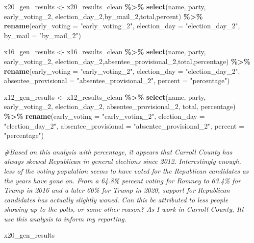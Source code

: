 \documentclass[
]{article}
\newenvironment{Shaded}{\begin{snugshade}}{\end{snugshade}}
\newcommand{\AttributeTok}[1]{\textcolor[rgb]{0.13,0.29,0.53}{#1}}
\newcommand{\CommentTok}[1]{\textcolor[rgb]{0.56,0.35,0.01}{\textit{#1}}}
\newcommand{\FunctionTok}[1]{\textcolor[rgb]{0.13,0.29,0.53}{\textbf{#1}}}
\newcommand{\NormalTok}[1]{#1}
\newcommand{\OtherTok}[1]{\textcolor[rgb]{0.56,0.35,0.01}{#1}}
\newcommand{\SpecialCharTok}[1]{\textcolor[rgb]{0.81,0.36,0.00}{\textbf{#1}}}
\newcommand{\StringTok}[1]{\textcolor[rgb]{0.31,0.60,0.02}{#1}}
\begin{document}
\begin{Shaded}
\begin{Highlighting}[]
\NormalTok{x20\_gen\_results }\OtherTok{\textless{}{-}}\NormalTok{ x20\_results\_clean }\SpecialCharTok{\%\textgreater{}\%} 
  \FunctionTok{select}\NormalTok{(name, party, early\_voting\_2, election\_day\_2,by\_mail\_2,total,percent) }\SpecialCharTok{\%\textgreater{}\%} 
  \FunctionTok{rename}\NormalTok{(}\AttributeTok{early\_voting =} \StringTok{"early\_voting\_2"}\NormalTok{,}
         \AttributeTok{election\_day =} \StringTok{"election\_day\_2"}\NormalTok{,}
         \AttributeTok{by\_mail =} \StringTok{"by\_mail\_2"}\NormalTok{)}

\NormalTok{x16\_gen\_results }\OtherTok{\textless{}{-}}\NormalTok{ x16\_results\_clean }\SpecialCharTok{\%\textgreater{}\%} 
  \FunctionTok{select}\NormalTok{(name, party, early\_voting\_2, election\_day\_2,absentee\_provisional\_2,total,percentage) }\SpecialCharTok{\%\textgreater{}\%} 
  \FunctionTok{rename}\NormalTok{(}\AttributeTok{early\_voting =} \StringTok{"early\_voting\_2"}\NormalTok{,}
         \AttributeTok{election\_day =} \StringTok{"election\_day\_2"}\NormalTok{,}
         \AttributeTok{absentee\_provisional =} \StringTok{"absentee\_provisional\_2"}\NormalTok{,}
         \AttributeTok{percent =} \StringTok{"percentage"}\NormalTok{)}

\NormalTok{x12\_gen\_results }\OtherTok{\textless{}{-}}\NormalTok{ x12\_results\_clean }\SpecialCharTok{\%\textgreater{}\%} 
  \FunctionTok{select}\NormalTok{(name, party, early\_voting\_2, election\_day\_2, absentee\_provisional\_2, total, percentage) }\SpecialCharTok{\%\textgreater{}\%} 
  \FunctionTok{rename}\NormalTok{(}\AttributeTok{early\_voting =} \StringTok{"early\_voting\_2"}\NormalTok{,}
         \AttributeTok{election\_day =} \StringTok{"election\_day\_2"}\NormalTok{,}
         \AttributeTok{absentee\_provisional =} \StringTok{"absentee\_provisional\_2"}\NormalTok{,}
         \AttributeTok{percent =} \StringTok{"percentage"}\NormalTok{)}

\CommentTok{\#Based on this analysis with percentage, it appears that Carroll County has always skewed Republican in general elections since 2012. Interestingly enough, less of the voting population seems to have voted for the Republican candidates as the years have gone on. From a 64.8\% percent voting for Romney to 63.4\% for Trump in 2016 and a later 60\% for Trump in 2020, support for Republican candidates has actually slightly waned. Can this be attributed to less people showing up to the polls, or some other reason? As I work in Carroll County, I\textquotesingle{}ll use this analysis to inform my reporting.}

\NormalTok{x20\_gen\_results}
\end{Highlighting}
\end{Shaded}
\end{document}
